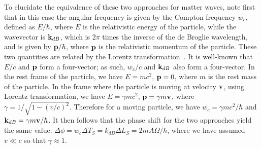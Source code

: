 \documentclass[aps,pra,letterpaper,superscriptaddress,showpacs,amsmath,floats,twocolumn]{revtex4-1}
\begin{document}
To elucidate the equivalence of these two approaches for matter waves, note first that in this case the angular frequency is given by the Compton frequency $w_c$, defined as $E/\hbar$, where $E$ is the relativistic energy of the particle, while the wavevector is $\vb{k}_{dB}$, which is $2\pi$ times the inverse of the de Broglie wavelength, and is given by $\vb{p}/\hbar$, where $\vb{p}$ is the relativistic momentum of the particle. These two quantities are related by the Lorentz transformation~\cite{Haslett,Lan,COSAIN}. It is well-known that $E/c$ and $\vb{p}$ form a four-vector; as such, $w_c/c$ and $\vb{k}_{dB}$ also form a four-vector. In the rest frame of the particle, we have $E=mc^2$, $\vb{p}=0$, where $m$ is the rest mass of the particle. In the frame where the particle is moving at velocity $\vb{v}$, using Lorentz transformation, we have $E=\gamma mc^2$, $\vb{p}=\gamma m\vb{v}$, where $\gamma=1/\sqrt{1-(v/c)^2}$. Therefore for a moving particle, we have $w_c=\gamma mc^2/\hbar$ and $\vb{k}_{dB}=\gamma m\vb{v}/\hbar$. It then follows that the phase shift for the two approaches yield the same value: $\Delta\phi=w_c\Delta T_{S}= k_{dB}\Delta L_{S} = 2mA\Omega/\hbar$, where we have assumed $v \ll c$ so that $\gamma \approx 1$. 
\end{document}
